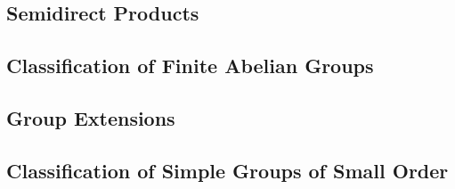 \subsection{Semidirect Products} 

\subsection{Classification of Finite Abelian Groups} 

\subsection{Group Extensions}

\subsection{Classification of Simple Groups of Small Order}

